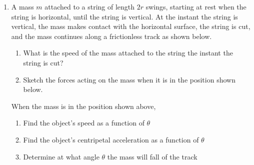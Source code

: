 \documentclass{../../../oss-classkick}
\begin{document}
\begin{enumerate}[leftmargin=15pt]
\item A mass $m$ attached to a string of length $2r$ swings, starting at rest
  when the string is horizontal, until the string is vertical. At the instant
  the string is vertical, the mass makes contact with the horizontal surface,
  the string is cut, and the mass continues along a frictionless track as shown
  below.
  \begin{center}
    \vspace{-.1in}
  \end{center}
  \begin{enumerate}[leftmargin=18pt]
  \item What is the speed of the mass attached to the string the instant the
    string is cut?
    \vspace{\stretch1}
  \item Sketch the forces acting on the mass when it is in the position shown
    below.
    \begin{center}
    \end{center}
  \end{enumerate}
  When the mass is in the position shown above,
  \begin{enumerate}[resume]
  \item Find the object's speed as a function of $\theta$
  \item Find the object's centripetal acceleration as a function of $\theta$
  \item Determine at what angle $\theta$ the mass will fall of the track
  \end{enumerate}
  \vspace{\stretch1}
  \newpage


\end{enumerate}
\end{document}
